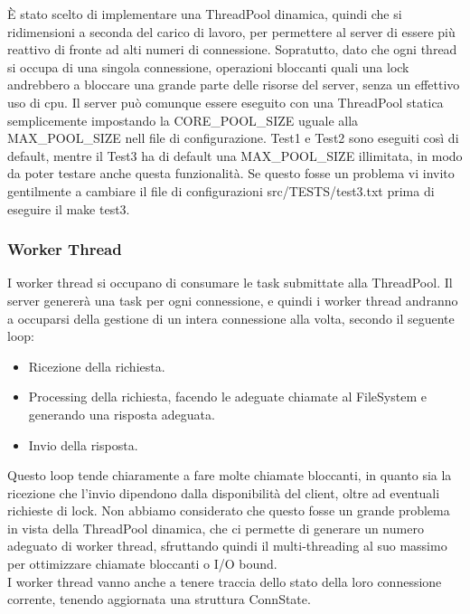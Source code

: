 \documentclass[11pt]{article}
\begin{document}
\begin{flushleft}
È stato scelto di implementare una ThreadPool dinamica, quindi che si ridimensioni a seconda del carico di lavoro, per permettere al server di essere più reattivo di fronte ad alti numeri di connessione.
Sopratutto, dato che ogni thread si occupa di una singola connessione, operazioni bloccanti quali una lock andrebbero a bloccare una grande parte delle risorse del server, senza un effettivo uso di cpu. Il server può comunque essere eseguito con una ThreadPool statica semplicemente impostando la CORE\_POOL\_SIZE uguale alla MAX\_POOL\_SIZE nell file di configurazione. Test1 e Test2 sono eseguiti così di default, mentre il Test3 ha di default una MAX\_POOL\_SIZE illimitata, in modo da poter testare anche questa funzionalità. Se questo fosse un problema vi invito gentilmente a cambiare il file di configurazioni src/TESTS/test3.txt prima di eseguire il make test3.

\subsubsection{Worker Thread}
I worker thread si occupano di consumare le task submittate alla ThreadPool. Il server genererà una task per ogni connessione, e quindi i worker thread andranno a occuparsi della gestione di un intera connessione alla volta, secondo il seguente loop: 
\begin{itemize}

\item Ricezione della richiesta.

\item Processing della richiesta, facendo le adeguate chiamate al FileSystem e generando una risposta adeguata.

\item Invio della risposta.

\end{itemize}

Questo loop tende chiaramente a fare molte chiamate bloccanti, in quanto sia la ricezione che l'invio dipendono dalla disponibilità del client, oltre ad eventuali richieste di lock.
Non abbiamo considerato che questo fosse un grande problema in vista della ThreadPool dinamica, che ci permette di generare un numero adeguato di worker thread, sfruttando quindi il multi-threading al suo massimo per ottimizzare chiamate bloccanti o I/O bound.
\\
I worker thread vanno anche a tenere traccia dello stato della loro connessione corrente, tenendo aggiornata una struttura ConnState.


\end{flushleft}
\end{document}

